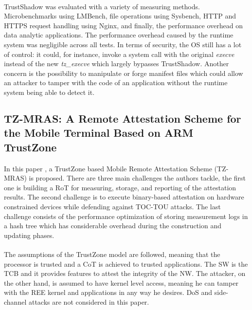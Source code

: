 \paragraph*{}
TrustShadow was evaluated with a variety of measuring methods. Microbenchmarks using LMBench, file operations using Sysbench, HTTP and HTTPS request handling using Nginx, and finally, the performance overhead on data analytic applications. The performance overhead caused by the runtime system was negligible across all tests. In terms of security, the OS still has a lot of control: it could, for instance, invoke a system call with the original \textit{execve} instead of the new \textit{tz\_execve} which largely bypasses TrustShadow. Another concern is the possibility to manipulate or forge manifest files which could allow an attacker to tamper with the code of an application without the runtime system being able to detect it. 

\subsection*{TZ-MRAS: A Remote Attestation Scheme for the Mobile Terminal Based on ARM TrustZone}  

\paragraph*{}
In this paper \cite{WangZiwang2020TARA}, a TrustZone based Mobile Remote Attestation Scheme (TZ-MRAS) is proposed. There are three main challenges the authors tackle, the first one is building a RoT for measuring, storage, and reporting of the attestation results. The second challenge is to execute binary-based attestation on hardware constrained devices while defending against TOC-TOU attacks. The last challenge consists of the performance optimization of storing measurement logs in a hash tree which has considerable overhead during the construction and updating phases. 

\paragraph*{}
The assumptions of the TrustZone model are followed, meaning that the processor is trusted and a CoT is achieved to trusted applications. The SW is the TCB and it provides features to attest the integrity of the NW. The attacker, on the other hand, is assumed to have kernel level access, meaning he can tamper with the REE kernel and applications in any way he desires. DoS and side-channel attacks are not considered in this paper.


